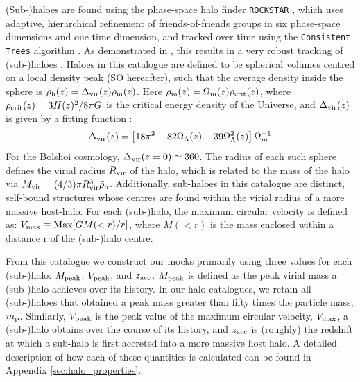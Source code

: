 \documentclass[useAMS,fleqn,usenatbib]{mnras}
\begin{document}
(Sub-)haloes are found using the phase-space halo finder {\tt ROCKSTAR} \citep{Behroozi:2013cn}, which uses adaptive, hierarchical refinement of friends-of-friends groups in six phase-space dimensions and one time dimension, and tracked over time using the {\tt Consistent Trees} algorithm \citep{Behroozi:2013dz}.  As demonstrated in \cite{Knebe:2011jc, Knebe:2013bp}, this results in a very robust tracking of (sub-)haloes \citep[also see][]{vandenBosch:2016ky}. Haloes in this catalogue are defined to be spherical volumes centred on a local density peak (SO hereafter), such that the average density inside the sphere is $\bar{\rho}_{\rm h}(z) = \Delta_{\rm vir}(z)\rho_{\rm m}(z)$.  Here $\rho_{\rm m}(z) = \Omega_{\rm m}(z) \rho_{\rm crit}(z)$, where $\rho_{\rm crit}(z) = 3H(z)^2/8\pi G$ is the critical energy density of the Universe, and $\Delta_{\rm vir}(z)$ is given by a fitting function \citep{Bryan:1998cc}:
%
\begin{equation}
\Delta_{\rm vir}(z) = \left[ 18\pi^2 - 82\Omega_{\Lambda}(z) - 39\Omega_{\Lambda}^2(z) \right]\Omega_m^{-1}
\end{equation}
%
For the Bolshoi cosmology, $\Delta_{\rm vir}(z=0)\simeq 360$.  The radius of each such sphere defines the virial radius $R_{\rm vir}$ of the halo, which is related to the mass of the halo via $M_{\rm vir} = (4/3)\pi R_{\rm vir}^3\bar{\rho}_{\rm h}$. Additionally, sub-haloes in this catalogue are distinct, self-bound structures whose centres are found within the virial radius of a more massive host-halo.  For each (sub-)halo, the maximum circular velocity is defined as: $V_{\rm max} \equiv {\rm Max}[GM(<r)/r]$, where $M(<r)$ is the mass enclosed within a distance r of the (sub-)halo centre.

From this catalogue we construct our mocks primarily using three values for each (sub-)halo: $M_{\rm peak}$, $V_{\rm peak}$, and $z_{\rm acc}$.  $M_{\rm peak}$ is defined as the peak virial mass a (sub-)halo achieves over its history.  In our halo catalogues, we retain all (sub-)haloes that obtained a peak mass greater than fifty times the particle mass, $m_{\rm p}$. Similarly, $V_{\rm peak}$ is the peak value of the maximum circular velocity, $V_{\rm max}$, a (sub-)halo obtains over the course of its history, and  $z_{\rm acc}$ is (roughly) the redshift at which a sub-halo is first accreted into a more massive host halo.  A detailed description of how each of these quantities is calculated can be found in Appendix \ref{sec:halo_properties}.
\end{document}
